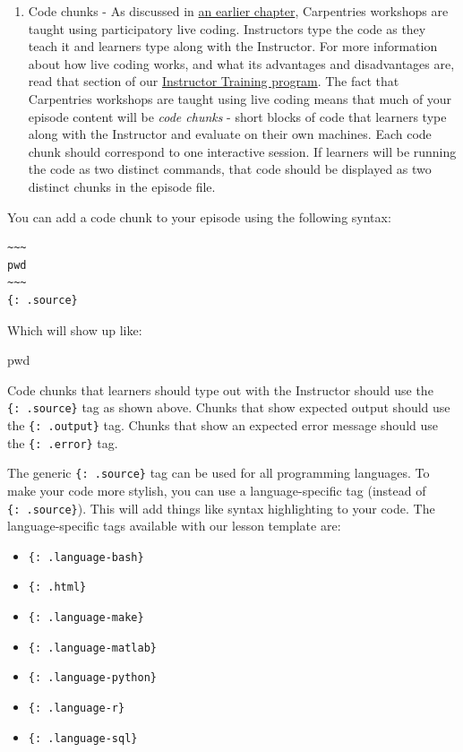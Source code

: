 \documentclass[]{book}
\newenvironment{Shaded}{\begin{snugshade}}{\end{snugshade}}
\newcommand{\BuiltInTok}[1]{#1}
\providecommand{\tightlist}{%
  \setlength{\itemsep}{0pt}\setlength{\parskip}{0pt}}
\begin{document}
\begin{enumerate}
\def\labelenumi{\arabic{enumi}.}
\tightlist
\item
  Code chunks - As discussed in \href{https://carpentries.github.io/curriculum-development/developing-content.html}{an earlier chapter}, Carpentries workshops are taught using participatory
  live coding. Instructors
  type the code as they teach it and learners type along with the Instructor. For more information about how
  live coding works, and what its advantages and disadvantages are, read that section of our
  \href{https://carpentries.github.io/instructor-training/14-live/index.html}{Instructor Training program}. The fact
  that Carpentries workshops are taught using live coding means that much of your episode content will be
  \emph{code chunks} - short blocks of code that learners type along with the Instructor and evaluate on their own
  machines. Each code chunk should correspond to one interactive session. If learners will be
  running the code as two distinct commands, that code should be displayed as two distinct chunks in the episode
  file.
\end{enumerate}

You can add a code chunk to your episode using the following syntax:

\begin{verbatim}
~~~
pwd
~~~
{: .source}
\end{verbatim}

Which will show up like:

\begin{Shaded}
\begin{Highlighting}[]
\BuiltInTok{pwd}
\end{Highlighting}
\end{Shaded}

Code chunks that learners should type out with the Instructor should use the \texttt{\{:\ .source\}} tag as shown above.
Chunks that show expected output should use the \texttt{\{:\ .output\}} tag. Chunks that show an expected error
message should use the \texttt{\{:\ .error\}} tag.

The generic \texttt{\{:\ .source\}} tag can be used for all programming languages. To make your code more stylish,
you can use a language-specific tag (instead of \texttt{\{:\ .source\}}). This will add things like syntax highlighting
to your code. The language-specific tags available with our lesson template are:

\begin{itemize}
\tightlist
\item
  \texttt{\{:\ .language-bash\}}
\item
  \texttt{\{:\ .html\}}
\item
  \texttt{\{:\ .language-make\}}
\item
  \texttt{\{:\ .language-matlab\}}
\item
  \texttt{\{:\ .language-python\}}
\item
  \texttt{\{:\ .language-r\}}
\item
  \texttt{\{:\ .language-sql\}}
\end{itemize}
\end{document}
